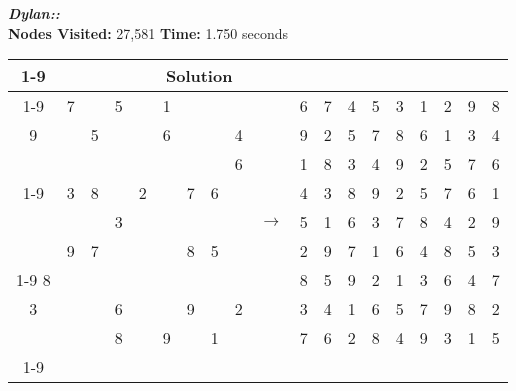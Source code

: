 \documentclass{article}
\begin{document}
\small\emph{\textbf{Dylan::}}\\ \textbf{Nodes Visited:} 27,581 \textbf{Time:} 1.750 seconds\\
\begin{tabular}{||c|c|c||c|c|c||c|c|c|| c ||c|c|c||c|c|c||c|c|c||}
  \cmidrule{1-9} \cmidrule{11-19}
  \multicolumn{9}{|c|}{Problem} &                   & \multicolumn{9}{|c|}{Solution}   \\\cmidrule{1-9} \cmidrule{11-19} \morecmidrules \cmidrule{1-9} \cmidrule{11-19}
  & 7 &   & 5 &   & 1 &   &   &   &  & 6 & 7 & 4 & 5 & 3 & 1 & 2 & 9 & 8\\\morecmidrules \cmidrule{1-9} \cmidrule{11-19}
9 &   & 5 &   &   & 6 &   &   & 4 &  & 9 & 2 & 5 & 7 & 8 & 6 & 1 & 3 & 4\\\morecmidrules \cmidrule{1-9} \cmidrule{11-19}
  &   &   &   &   &   &   &   & 6 &  & 1 & 8 & 3 & 4 & 9 & 2 & 5 & 7 & 6\\\cmidrule{1-9} \cmidrule{11-19} \morecmidrules \cmidrule{1-9} \cmidrule{11-19}
  & 3 & 8 &   & 2 &   & 7 & 6 &   &  & 4 & 3 & 8 & 9 & 2 & 5 & 7 & 6 & 1\\\morecmidrules \cmidrule{1-9} \cmidrule{11-19}
  &   &   & 3 &   &   &   &   &   & $\rightarrow$  & 5 & 1 & 6 & 3 & 7 & 8 & 4 & 2 & 9\\\morecmidrules \cmidrule{1-9} \cmidrule{11-19}
  & 9 & 7 &   &   &   & 8 & 5 &   &  & 2 & 9 & 7 & 1 & 6 & 4 & 8 & 5 & 3\\\cmidrule{1-9} \cmidrule{11-19} \morecmidrules \cmidrule{1-9} \cmidrule{11-19}
8 &   &   &   &   &   &   &   &   &  & 8 & 5 & 9 & 2 & 1 & 3 & 6 & 4 & 7\\\morecmidrules \cmidrule{1-9} \cmidrule{11-19}
3 &   &   & 6 &   &   & 9 &   & 2 &  & 3 & 4 & 1 & 6 & 5 & 7 & 9 & 8 & 2 \\\morecmidrules \cmidrule{1-9} \cmidrule{11-19}
  &   &   & 8 &   & 9 &   & 1 &   &  & 7 & 6 & 2 & 8 & 4 & 9 & 3 & 1 & 5\\\cmidrule{1-9} \cmidrule{11-19} \morecmidrules \cmidrule{1-9} \cmidrule{11-19}
 \end{tabular}
\\
\end{document}
